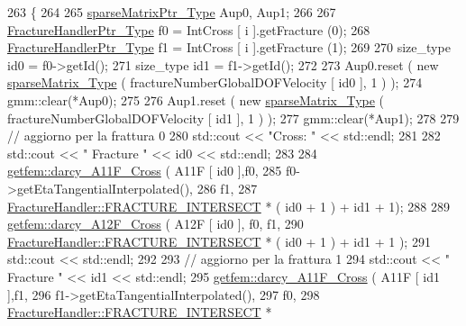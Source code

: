 \begin{DoxyCode}
263     \{
264         
265         \hyperlink{Core_8h_a87137a9501b38c724ac80bc955164bb7}{sparseMatrixPtr\_Type} Aup0, Aup1;
266             
267         \hyperlink{FractureHandler_8h_af23fb7a30aaff864bd42587af4f1e78a}{FractureHandlerPtr\_Type} f0 = IntCross [ i ].getFracture (0);
268         \hyperlink{FractureHandler_8h_af23fb7a30aaff864bd42587af4f1e78a}{FractureHandlerPtr\_Type} f1 = IntCross [ i ].getFracture (1);
269         
270         size\_type id0 = f0->getId();
271         size\_type id1 = f1->getId();
272         
273         Aup0.reset ( \textcolor{keyword}{new} \hyperlink{Core_8h_afba9f623673e2ae32054015bdb5500f9}{sparseMatrix\_Type} ( fractureNumberGlobalDOFVelocity [ id0 ], 1 ) 
      );
274         gmm::clear(*Aup0);
275 
276         Aup1.reset ( \textcolor{keyword}{new} \hyperlink{Core_8h_afba9f623673e2ae32054015bdb5500f9}{sparseMatrix\_Type} ( fractureNumberGlobalDOFVelocity [ id1 ], 1 ) 
      );
277         gmm::clear(*Aup1);
278 
279         \textcolor{comment}{// aggiorno per la frattura 0}
280         std::cout << \textcolor{stringliteral}{"Cross: "} << std::endl;
281         
282         std::cout << \textcolor{stringliteral}{" Fracture "} << id0 << std::endl;
283         
284         \hyperlink{namespacegetfem_a9b6ded8fe1019aa04e66d2047d0f29dd}{getfem::darcy\_A11F\_Cross} ( A11F [ id0 ],f0,
285                                    f0->getEtaTangentialInterpolated(), 
286                                    f1,
287                                    \hyperlink{classFractureHandler_a495ad4fc72d0c47c8f0424842f1153aaa781cae3f3b99bf9357fed2833d315537}{FractureHandler::FRACTURE\_INTERSECT} *
       ( id0 + 1 ) + id1 + 1);
288 
289         \hyperlink{namespacegetfem_a88df6c0cb0765d5ab0fae27679cd30f4}{getfem::darcy\_A12F\_Cross} ( A12F [ id0 ], f0, f1,
290                                    \hyperlink{classFractureHandler_a495ad4fc72d0c47c8f0424842f1153aaa781cae3f3b99bf9357fed2833d315537}{FractureHandler::FRACTURE\_INTERSECT} *
       ( id0 + 1 ) + id1 + 1 );
291         std::cout << std::endl;
292         
293         \textcolor{comment}{// aggiorno per la frattura 1}
294         std::cout << \textcolor{stringliteral}{" Fracture "} << id1 << std::endl;
295         \hyperlink{namespacegetfem_a9b6ded8fe1019aa04e66d2047d0f29dd}{getfem::darcy\_A11F\_Cross} ( A11F [ id1 ],f1,
296                                    f1->getEtaTangentialInterpolated(),
297                                    f0,
298                                    \hyperlink{classFractureHandler_a495ad4fc72d0c47c8f0424842f1153aaa781cae3f3b99bf9357fed2833d315537}{FractureHandler::FRACTURE\_INTERSECT} *

\end{DoxyCode}
